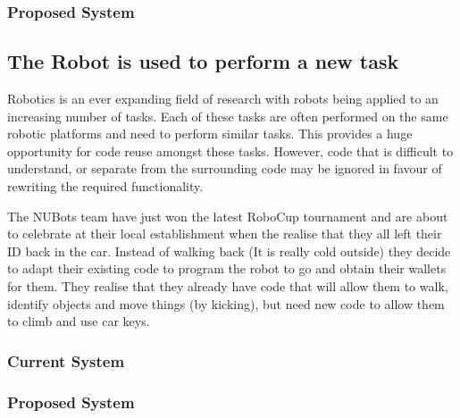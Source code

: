 \documentclass[english,12pt]{scrartcl}
\begin{document}
			\subsubsection{Proposed System}

		\subsection{The Robot is used to perform a new task}
			Robotics is an ever expanding field of research with robots being applied to an
			increasing number of tasks. Each of these tasks are often performed on the same robotic
			platforms and need to perform similar tasks. This provides a huge opportunity for code
			reuse amongst these tasks. However, code that is difficult to understand, or separate
			from the surrounding code may be ignored in favour of rewriting the required
			functionality.

			The NUBots team have just won the latest RoboCup tournament and are about to celebrate
			at their local establishment when the realise that they all left their ID back in the
			car. Instead of walking back (It is really cold outside) they decide to adapt
			their existing code to program the robot to go and obtain their wallets for them. They
			realise that they already have code that will allow them to walk, identify objects and
			move things (by kicking), but need new code to allow them to climb and use car keys.

			\subsubsection{Current System}
			\subsubsection{Proposed System}
\end{document}
